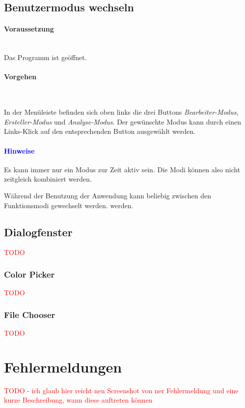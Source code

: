 \documentclass[enabledeprecatedfontcommands,fontsize=11pt,paper=a4,twoside]{scrartcl}
\newcommand*{\red}{\textcolor{red}}
\newcounter{one}
\newcounter{two}[one]
\newcommand*{\hint}{\paragraph{\textcolor{blue}{Hinweise}}}
\newcommand*{\condition}{\paragraph{Voraussetzung}$\;$ \vspace{0.2cm}\\}
\newcommand*{\actions}{\paragraph{Vorgehen} $\;$\vspace{0.2cm}\\}
\let\tempone\itemize
\let\temptwo\enditemize
\renewenvironment{itemize}{\tempone\addtolength{\itemsep}{-10.0pt}}{\temptwo}
\let\origenumerate\enumerate
\let\origendenumerate\endenumerate
\renewenvironment{enumerate}{\origenumerate \addtolength{\itemsep}{-10.0pt}}{\origendenumerate}
\begin{document}
\subsection{Benutzermodus wechseln}
\condition 
Das Programm ist geöffnet.
\actions
\begin{enumerate}
\item In der Menüleiste befinden sich oben links die drei Buttons \textit{Bearbeiter-Modus}, \textit{Ersteller-Modus} und \textit{Analyse-Modus}. Der gewünschte Modus kann durch einen Links-Klick auf den entsprechenden Button ausgewählt werden.
\end{enumerate} 
\hint
\begin{itemize}
\item Es kann immer nur ein Modus zur Zeit aktiv sein. Die Modi können also nicht zeitgleich kombiniert werden.
\item Während der Benutzung der Anwendung kann beliebig zwischen den Funktionsmodi gewechselt werden. werden.
\end{itemize}


			 
		
\subsection{Dialogfenster} \label{dialog}
\red{TODO}

\subsubsection{Color Picker} \label{colorpicker}
\red{TODO}

\subsubsection{File Chooser} 
\red{TODO}

\section{Fehlermeldungen} \label{fehlermeldungen}
\red{TODO - ich glaub hier reicht nen Screenshot von ner Fehlermeldung und eine kurze Beschreibung, wann diese auftreten können}	
\end{document}
